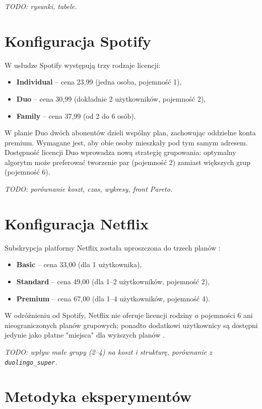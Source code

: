 \emph{TODO: rysunki, tabele.}

\section{Konfiguracja Spotify}

W usłudze Spotify występują trzy rodzaje licencji:
\begin{itemize}
  \item \textbf{Individual} -- cena 23,99 (jedna osoba, pojemność 1),
  \item \textbf{Duo} -- cena 30,99 (dokładnie 2 użytkowników, pojemność 2),
  \item \textbf{Family} -- cena 37,99 (od 2 do 6 osób).
\end{itemize}

W planie Duo dwóch abonentów dzieli wspólny plan, zachowując oddzielne konta premium. Wymagane jest, aby obie osoby mieszkały pod tym samym adresem. Dostępność licencji Duo wprowadza nową strategię grupowania: optymalny algorytm może preferować tworzenie par (pojemność 2) zamiast większych grup (pojemność 6).

\emph{TODO: porównanie koszt, czas, wykresy, front Pareto.}

\section{Konfiguracja Netflix}

Subskrypcja platformy Netflix została uproszczona do trzech planów \cite{netflix_plans}:
\begin{itemize}
  \item \textbf{Basic} -- cena 33,00 (dla 1 użytkownika),
  \item \textbf{Standard} -- cena 49,00 (dla 1--2 użytkowników, pojemność 2),
  \item \textbf{Premium} -- cena 67,00 (dla 1--4 użytkowników, pojemność 4).
\end{itemize}

W odróżnieniu od Spotify, Netflix nie oferuje licencji rodziny o pojemności 6 ani nieograniczonych planów grupowych; ponadto dodatkowi użytkownicy są dostępni jedynie jako płatne "miejsca" dla wyższych planów \cite{netflix_plans}.

\emph{TODO: wpływ małe grupy (2--4) na koszt i strukturę, porównanie z \texttt{duolingo\_super}.}

\section{Metodyka eksperymentów}

